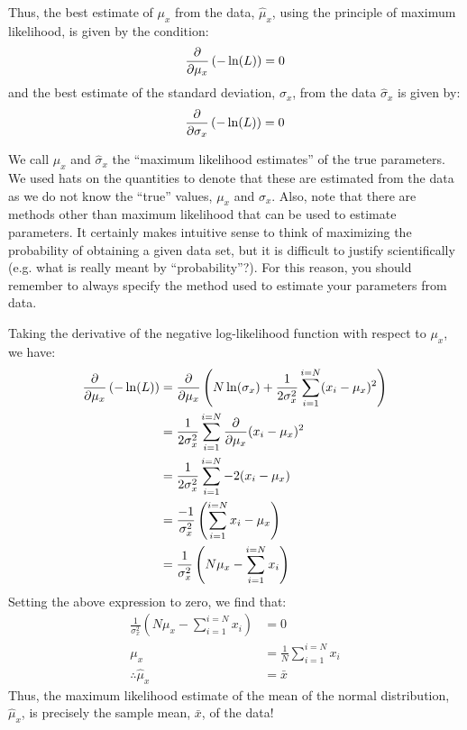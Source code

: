 Thus, the best estimate of $\mu_x$ from the data, $\hat\mu_x$, using the principle of maximum likelihood, is given by the condition:
\begin{align}
\label{eqn:muML}
\frac{\partial }{\partial \mu_x}\left(-\ln(L)\right)=0
\end{align}
and the best estimate of the standard deviation, $\sigma_x$, from the data $\hat\sigma_x$ is given by:
\begin{align}
\label{eqn:sigML}
\frac{\partial }{\partial \sigma_x}\left(-\ln(L)\right)=0
\end{align}

We call $\hat\mu_x$ and $\hat\sigma_x$ the ``maximum likelihood estimates'' of the true parameters. We used hats on the quantities to denote that these are estimated from the data as we do not know the ``true'' values, $\mu_x$ and $\sigma_x$. Also, note that there are methods other than maximum likelihood that can be used to estimate parameters. It certainly makes intuitive sense to think of maximizing the probability of obtaining a given data set, but it is difficult to justify scientifically (e.g. what is really meant by ``probability''?). For this reason, you should remember to always specify the method used to estimate your parameters from data.

Taking the derivative of the negative log-likelihood function with respect to $\mu_x$, we have:
\begin{align}
\frac{\partial }{\partial \mu_x}\left(-\ln(L)\right) &= \frac{\partial }{\partial \mu_x}\left(N\ln(\sigma_x)+\frac{1}{2\sigma_x^2}\sum_{i=1}^{i=N}(x_i-\mu_x)^2\right)\nonumber\\
&=\frac{1}{2\sigma_x^2}\sum_{i=1}^{i=N}\frac{\partial }{\partial \mu_x}(x_i-\mu_x)^2\nonumber\\
&=\frac{1}{2\sigma_x^2}\sum_{i=1}^{i=N}-2(x_i-\mu_x)\nonumber\\
&=\frac{-1}{\sigma_x^2}\left(\sum_{i=1}^{i=N}x_i-\mu_x\right)\nonumber\\
&=\frac{1}{\sigma_x^2}\left(N\mu_x-\sum_{i=1}^{i=N}x_i\right)\nonumber\\
\end{align}
Setting the above expression to zero, we find that:
\begin{align}
\frac{1}{\sigma_x^2}\left(N\mu_x-\sum_{i=1}^{i=N}x_i\right)&=0\nonumber\\
\mu_x&=\frac{1}{N}\sum_{i=1}^{i=N}x_i\nonumber\\
\therefore \hat\mu_x&=\bar x
\end{align}
Thus, the maximum likelihood estimate of the mean of the normal distribution, $\hat\mu_x$, is precisely the sample mean, $\bar x$, of the data!

